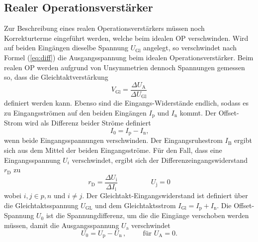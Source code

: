 \subsection{Realer Operationsverstärker}%
\label{sub:realer_operationsverstaerker}

Zur Beschreibung eines realen Operationsverstärkers müssen noch Korrekturterme
eingeführt werden, welche beim idealen OP verschwinden.
Wird auf beiden Eingängen dieselbe Spannung $U_\text{Gl}$ angelegt, so
verschwindet nach Formel (\ref{eq:diff}) die Ausgangsspannung beim idealen
Operationsverstärker.
Beim realen OP werden aufgrund von Unsymmetrien dennoch Spannungen gemessen so, dass
die Gleichtaktverstärkung
\begin{equation}
		V_\text{Gl} = \frac{\Delta U_\text{A}}{\Delta U_\text{Gl}}
\end{equation}
definiert werden kann.
Ebenso sind die Eingangs-Widerstände endlich, sodass es zu Eingangsströmen auf
den beiden Eingängen $I_\text{p}$ und $I_\text{n}$ kommt.
Der Offset-Strom wird als Differenz beider Ströme definiert
\begin{equation}
  I_0 = I_\text{p} - I_\text{n}\text{,}
\end{equation}
wenn beide Eingangsspannungen verschwinden.
Der Eingangsruhestrom $I_\text{B}$ ergibt sich aus dem Mittel der beiden Eingangsströme.
Für den Fall, dass eine Eingangsspannung $U_{i}$ verschwindet, ergibt sich der
Differenzeingangswiderstand $r_\text{D}$ zu
\begin{equation}
		r_\text{D} = \frac{\Delta U_\text{i}}{\Delta I_\text{i}} \hspace{2cm} U_\text{j} = 0
\end{equation}
wobei $i,j \in p,n$ und $i \neq j$.
Der Gleichtakt-Eingangswiderstand ist definiert über die Gleichtaktsspannung
$U_\text{GL}$ und dem Gleichtaktsstrom $I_\text{Gl} = I_\text{p} + I_\text{n}$.
Die Offset-Spannung $U_0$ ist die Spannungdifferenz, um die die Eingänge
verschoben werden müssen, damit die Ausgangsspannung $U_\text{a}$ verschwindet
\begin{equation}
		U_0 = U_\text{p} - U_\text{n} \, , \hspace{1cm} \text{für } U_\text{A} = 0.
\end{equation}

